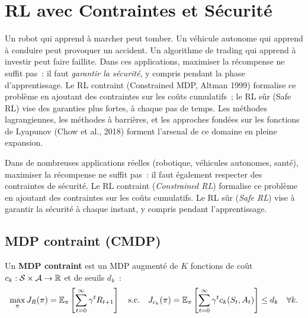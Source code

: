 \chapter{RL avec Contraintes et S\'ecurit\'e}
\label{ch:contraintes}

Un robot qui apprend \`a marcher peut tomber. Un v\'ehicule autonome qui apprend \`a conduire peut provoquer un accident. Un algorithme de trading qui apprend \`a investir peut faire faillite. Dans ces applications, maximiser la r\'ecompense ne suffit pas~: il faut \emph{garantir la s\'ecurit\'e}, y compris pendant la phase d'apprentissage. Le RL contraint (Constrained MDP, Altman 1999) formalise ce probl\`eme en ajoutant des contraintes sur les co\^uts cumulatifs~; le RL s\^ur (Safe RL) vise des garanties plus fortes, \`a chaque pas de temps. Les m\'ethodes lagrangiennes, les m\'ethodes \`a barri\`eres, et les approches fond\'ees sur les fonctions de Lyapunov (Chow et al., 2018) forment l'arsenal de ce domaine en pleine expansion.

\begin{intuition}
Dans de nombreuses applications r\'eelles (robotique, v\'ehicules autonomes,
sant\'e), maximiser la r\'ecompense ne suffit pas~: il faut \'egalement
respecter des contraintes de s\'ecurit\'e. Le RL contraint (\emph{Constrained RL})
formalise ce probl\`eme en ajoutant des contraintes sur les co\^uts cumulatifs.
Le RL s\^ur (\emph{Safe RL}) vise \`a garantir la s\'ecurit\'e \`a chaque instant,
y compris pendant l'apprentissage.
\end{intuition}

\section{MDP contraint (CMDP)}

\begin{definition}[CMDP]
Un \textbf{MDP contraint} est un MDP augment\'e de $K$ fonctions de co\^ut
$c_k : \mathcal{S} \times \mathcal{A} \to \mathbb{R}$ et de seuils $d_k$~:
\[
    \max_\pi J_R(\pi) = \mathbb{E}_\pi\left[\sum_{t=0}^\infty \gamma^t R_{t+1}\right]
    \quad \text{s.c.} \quad
    J_{c_k}(\pi) = \mathbb{E}_\pi\left[\sum_{t=0}^\infty \gamma^t c_k(S_t, A_t)\right] \leq d_k
    \quad \forall k.
\]
\end{definition}

